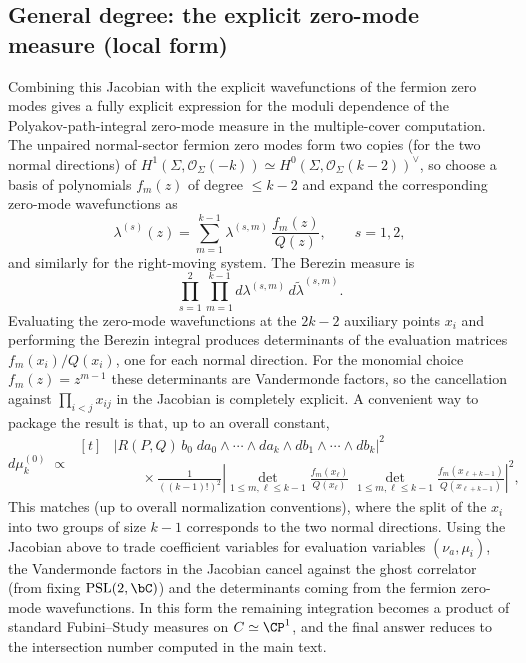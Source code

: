 \documentclass[12pt]{article}
\begin{document}
\subsection{General degree: the explicit zero-mode measure (local form)}
Combining this Jacobian with the explicit wavefunctions of the fermion zero
modes gives a fully explicit expression for the moduli dependence of the
Polyakov-path-integral zero-mode measure in the multiple-cover computation. The
unpaired normal-sector fermion zero modes form two copies (for the two normal
directions) of $H^1(\Sigma,\mathcal{O}_\Sigma(-k))\simeq H^0(\Sigma,\mathcal{O}_\Sigma(k-2))^\vee$,
so choose a basis of polynomials $f_m(z)$ of degree $\le k-2$ and expand the
corresponding zero-mode wavefunctions as
\begin{equation*}
  \lambda^{(s)}(z)=\sum_{m=1}^{k-1}\lambda^{(s,m)}\,\frac{f_m(z)}{Q(z)},
  \qquad s=1,2,
\end{equation*}
and similarly for the right-moving system. The Berezin measure is
\begin{equation*}
  \prod_{s=1}^2\prod_{m=1}^{k-1} d\lambda^{(s,m)}\, d\tilde{\lambda}^{(s,m)}.
\end{equation*}
Evaluating the zero-mode wavefunctions at the $2k-2$ auxiliary points $x_i$ and
performing the Berezin integral produces determinants of the evaluation matrices
$f_m(x_i)/Q(x_i)$, one for each normal direction. For the monomial choice
$f_m(z)=z^{m-1}$ these determinants are Vandermonde factors, so the cancellation
against $\prod_{i<j}x_{ij}$ in the Jacobian is completely explicit. A convenient
way to package the result is that, up to an overall constant,
\begin{equation}
  d\mu^{(0)}_{k}
  \;\propto\;
  \begin{aligned}[t]
    &\left|R(P,Q)\,b_0\; da_0\wedge\cdots\wedge da_k\wedge db_1\wedge\cdots\wedge db_k\right|^2\\
    &\qquad\times
    \frac{1}{((k-1)!)^2}
    \left|
      \det_{1\le m,\ell\le k-1}\frac{f_m(x_\ell)}{Q(x_\ell)}\;
      \det_{1\le m,\ell\le k-1}\frac{f_m(x_{\ell+k-1})}{Q(x_{\ell+k-1})}
    \right|^2,
  \end{aligned}
\label{eq:zeromode-measure-local}
\end{equation}
This matches \cite[Eq.~(19.208)]{Yin:FoundationsStringTheory} (up to overall
normalization conventions), where the split of the $x_i$ into two groups of size
$k-1$ corresponds to the
two normal directions. Using the Jacobian above to trade coefficient variables
for evaluation variables $(\nu_a,\mu_i)$, the Vandermonde factors in the Jacobian
cancel against the ghost correlator (from fixing $\mathrm{PSL}(2,\bC)$) and the
determinants coming from the fermion zero-mode wavefunctions. In this form the
remaining integration becomes a product of standard Fubini--Study measures on
$C\simeq\CP^1$, and the final answer reduces to the intersection number computed
in the main text.
\end{document}
